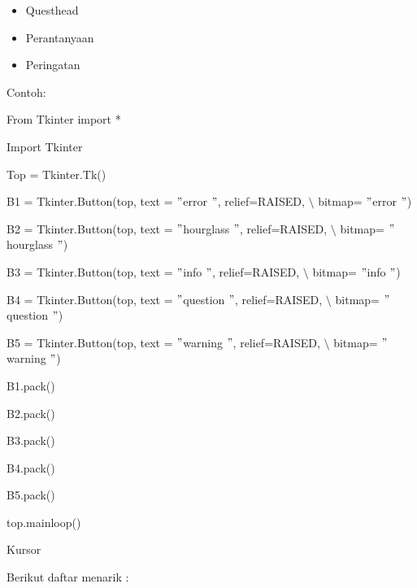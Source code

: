 \documentclass [12pt,a4paper,notitlepage,oneside,bahasa]{article}
\begin{document}
\begin{enumerate}
\begin{itemize}
\begin{itemize}
\noindent 
\item Questhead \par
\noindent 
\item Perantanyaan  \par
\noindent 
\item Peringatan\end{itemize}
 \par
\vspace{12pt}
Contoh: \par
{\fontsize{10pt}{10pt}\selectfont From Tkinter import *} \par
{\fontsize{10pt}{10pt}\selectfont Import Tkinter} \par
\vspace{10pt}
{\fontsize{10pt}{10pt}\selectfont Top = Tkinter.Tk()} \par
\vspace{10pt}
{\fontsize{10pt}{10pt}\selectfont B1 = Tkinter.Button(top, text = $ " $error $ " $, relief=RAISED,  $  \setminus  $ bitmap= $ " $error $ " $)} \par
{\fontsize{10pt}{10pt}\selectfont B2 = Tkinter.Button(top, text = $ " $hourglass $ " $, relief=RAISED,  $  \setminus  $ bitmap= $ " $hourglass $ " $)} \par
{\fontsize{10pt}{10pt}\selectfont B3 = Tkinter.Button(top, text = $ " $info $ " $, relief=RAISED,  $  \setminus  $ bitmap= $ " $info $ " $)} \par
{\fontsize{10pt}{10pt}\selectfont B4 = Tkinter.Button(top, text = $ " $question $ " $, relief=RAISED,  $  \setminus  $ bitmap= $ " $question $ " $)} \par
{\fontsize{10pt}{10pt}\selectfont B5 = Tkinter.Button(top, text = $ " $warning $ " $, relief=RAISED,  $  \setminus  $ bitmap= $ " $warning $ " $)} \par
\vspace{10pt}
{\fontsize{10pt}{10pt}\selectfont B1.pack()} \par
{\fontsize{10pt}{10pt}\selectfont B2.pack()} \par
{\fontsize{10pt}{10pt}\selectfont B3.pack()} \par
{\fontsize{10pt}{10pt}\selectfont B4.pack()} \par
{\fontsize{10pt}{10pt}\selectfont B5.pack()} \par
{\fontsize{10pt}{10pt}\selectfont top.mainloop()} \par
\noindent 
Kursor \par
\noindent 
Berikut daftar menarik : \par

\end{itemize}
\end{enumerate}
\end{document}
